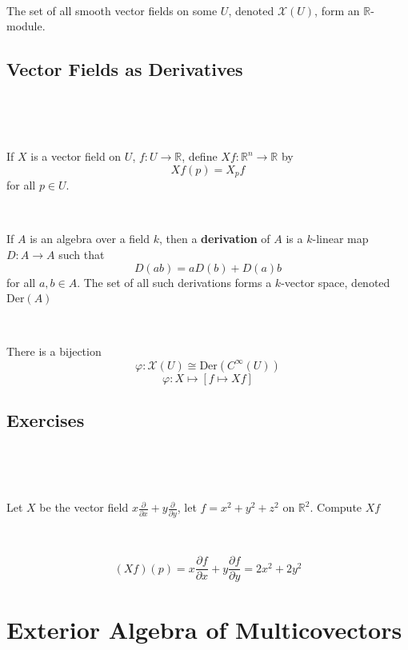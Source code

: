 \documentclass{article}
\begin{document}
\begin{proposition}
  \

  The set of all smooth vector fields on some $U$, denoted $\mathcal{X}(U)$, form an $\mathbb{R}$-module.
\end{proposition}

\subsection{Vector Fields as Derivatives}
\

\begin{definition}
  \

  If $X$ is a vector field on $U$, $f: U \to \mathbb{R}$, define $Xf: \mathbb{R}^n \to \mathbb{R}$ by $$Xf(p) = X_p f$$for all $p \in U$.
\end{definition}

\begin{definition}
  \

  If $A$ is an algebra over a field $k$, then a \textbf{derivation} of $A$ is a $k$-linear map $D:A \to A$ such that $$D(ab) = aD(b) + D(a)b$$ for all $a,b \in A$. The set of all such derivations forms a $k$-vector space, denoted $\text{Der}(A)$
\end{definition}

\begin{proposition}
  \

  There is a bijection $$\varphi: \mathcal{X}(U) \cong \text{Der}(C^\infty(U))$$$$\varphi: X \mapsto [f \mapsto Xf]$$
\end{proposition}

\subsection{Exercises}
\

\begin{exercise}[2.1]
  \

  Let $X$ be the vector field $x \frac{\partial }{\partial x} + y \frac{\partial }{\partial y}$, let $f = x^2 + y^2 + z^2$ on $\mathbb{R}^2$. Compute $Xf$
\end{exercise}

\begin{solution}
  \

  $$(Xf)(p) = x\frac{\partial f}{\partial x} + y\frac{\partial f}{\partial y} = 2x^2 + 2y^2$$
\end{solution}

\section{Exterior Algebra of Multicovectors}
\end{document}
